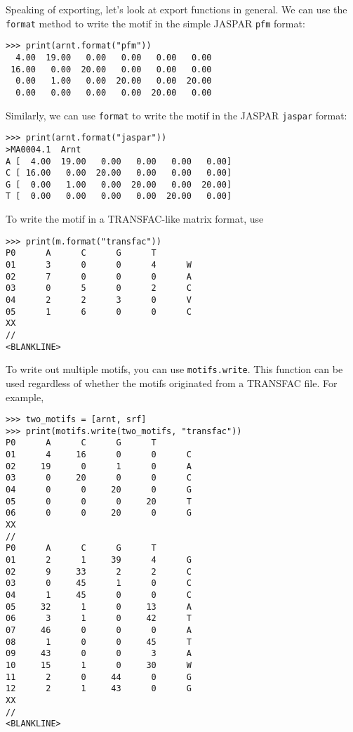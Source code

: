 Speaking of exporting, let's look at export functions in general.
We can use the \verb+format+ method to write the motif in the simple JASPAR \verb+pfm+ format:
\begin{verbatim}
>>> print(arnt.format("pfm"))
  4.00  19.00   0.00   0.00   0.00   0.00
 16.00   0.00  20.00   0.00   0.00   0.00
  0.00   1.00   0.00  20.00   0.00  20.00
  0.00   0.00   0.00   0.00  20.00   0.00
\end{verbatim}
Similarly, we can use \verb+format+ to write the motif in the JASPAR \verb+jaspar+ format:
\begin{verbatim}
>>> print(arnt.format("jaspar"))
>MA0004.1  Arnt
A [  4.00  19.00   0.00   0.00   0.00   0.00]
C [ 16.00   0.00  20.00   0.00   0.00   0.00]
G [  0.00   1.00   0.00  20.00   0.00  20.00]
T [  0.00   0.00   0.00   0.00  20.00   0.00]
\end{verbatim}

To write the motif in a TRANSFAC-like matrix format, use

\begin{verbatim}
>>> print(m.format("transfac"))
P0      A      C      G      T
01      3      0      0      4      W
02      7      0      0      0      A
03      0      5      0      2      C
04      2      2      3      0      V
05      1      6      0      0      C
XX
//
<BLANKLINE>
\end{verbatim}

To write out multiple motifs, you can use \verb+motifs.write+.
This function can be used regardless of whether the motifs originated from a TRANSFAC file. For example,

\begin{verbatim}
>>> two_motifs = [arnt, srf]
>>> print(motifs.write(two_motifs, "transfac"))
P0      A      C      G      T
01      4     16      0      0      C
02     19      0      1      0      A
03      0     20      0      0      C
04      0      0     20      0      G
05      0      0      0     20      T
06      0      0     20      0      G
XX
//
P0      A      C      G      T
01      2      1     39      4      G
02      9     33      2      2      C
03      0     45      1      0      C
04      1     45      0      0      C
05     32      1      0     13      A
06      3      1      0     42      T
07     46      0      0      0      A
08      1      0      0     45      T
09     43      0      0      3      A
10     15      1      0     30      W
11      2      0     44      0      G
12      2      1     43      0      G
XX
//
<BLANKLINE>
\end{verbatim}

